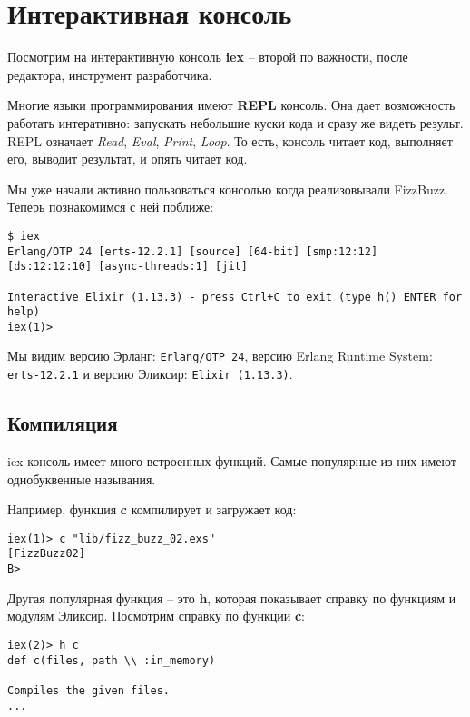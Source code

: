 \chapter{Интерактивная консоль}

Посмотрим на интерактивную консоль \textbf{iex} -- второй по важности, после редактора, инструмент разработчика.

Многие языки программирования имеют \textbf{REPL} консоль. Она дает возможность работать интеративно: запускать небольшие куски кода и сразу же видеть результ. REPL означает \textit{Read}, \textit{Eval}, \textit{Print}, \textit{Loop}. То есть, консоль читает код, выполняет его, выводит результат, и опять читает код.

Мы уже начали активно пользоваться консолью когда реализовывали FizzBuzz. Теперь познакомимся с ней поближе:

\begin{lstlisting}
$ iex
Erlang/OTP 24 [erts-12.2.1] [source] [64-bit] [smp:12:12] [ds:12:12:10] [async-threads:1] [jit]

Interactive Elixir (1.13.3) - press Ctrl+C to exit (type h() ENTER for help)
iex(1)> 
\end{lstlisting}

Мы видим версию Эрланг: \texttt{Erlang/OTP 24}, версию Erlang Runtime System: \texttt{erts-12.2.1} и версию Эликсир: \texttt{Elixir (1.13.3)}.

\section{Компиляция}

iex-консоль имеет много встроенных функций. Самые популярные из них имеют однобуквенные называния. 

Например, функция \textbf{c} компилирует и загружает код:

\begin{lstlisting}
iex(1)> c "lib/fizz_buzz_02.exs"
[FizzBuzz02]
B>
\end{lstlisting}

Другая популярная функция -- это \textbf{h}, которая показывает справку по функциям и модулям Эликсир. Посмотрим справку по функции \textbf{c}:

\begin{lstlisting}
iex(2)> h c
def c(files, path \\ :in_memory)                         

Compiles the given files.
...
\end{lstlisting}

